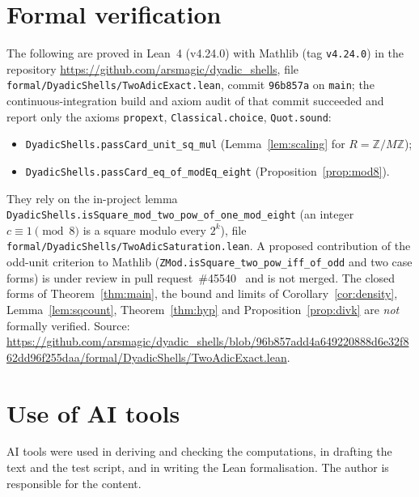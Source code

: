 \documentclass[11pt]{amsart}
\theoremstyle{remark}
\newcommand{\Z}{\mathbb{Z}}
\begin{document}
\section{Formal verification}\label{sec:lean}
The following are proved in Lean~4 (v4.24.0) with Mathlib (tag \texttt{v4.24.0}) in the repository \url{https://github.com/arsmagic/dyadic_shells}, file \texttt{formal/DyadicShells/TwoAdicExact.lean}, commit \texttt{96b857a} on \texttt{main}; the continuous-integration build and axiom audit of that commit succeeded and report only the axioms \texttt{propext}, \texttt{Classical.choice}, \texttt{Quot.sound}:
\begin{itemize}
\item \texttt{DyadicShells.passCard\_unit\_sq\_mul} (Lemma~\ref{lem:scaling} for $R=\Z/M\Z$);
\item \texttt{DyadicShells.passCard\_eq\_of\_modEq\_eight} (Proposition~\ref{prop:mod8}).
\end{itemize}
They rely on the in-project lemma \texttt{DyadicShells.isSquare\_mod\_two\_pow\_of\_one\_mod\_eight} (an integer $c\equiv1\pmod 8$ is a square modulo every $2^k$), file \texttt{formal/DyadicShells/TwoAdicSaturation.lean}. A proposed contribution of the odd-unit criterion to Mathlib (\texttt{ZMod.isSquare\_two\_pow\_iff\_of\_odd} and two case forms) is under review in pull request~\#45540~\cite{mathlibpr} and is not merged. The closed forms of Theorem~\ref{thm:main}, the bound and limits of Corollary~\ref{cor:density}, Lemma~\ref{lem:sqcount}, Theorem~\ref{thm:hyp} and Proposition~\ref{prop:divk} are \emph{not} formally verified. Source: \url{https://github.com/arsmagic/dyadic_shells/blob/96b857add4a649220888d6e32f862dd96f255daa/formal/DyadicShells/TwoAdicExact.lean}.

\section*{Use of AI tools}
AI tools were used in deriving and checking the computations, in drafting the text and the test script, and in writing the Lean formalisation. The author is responsible for the content.
\end{document}
